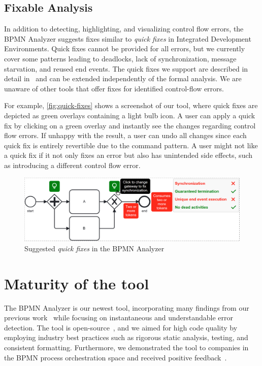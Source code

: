 \documentclass[
twocolumn
]{ceurart}
\begin{document}
\subsection{Fixable Analysis}
In addition to detecting, highlighting, and visualizing control flow errors, the BPMN Analyzer suggests fixes similar to \textit{quick fixes} in Integrated Development Environments.
Quick fixes cannot be provided for all errors, but we currently cover some patterns leading to deadlocks, lack of synchronization, message starvation, and reused end events.
The quick fixes we support are described in detail in~\cite{krauterInstantaneousComprehensibleFixable2024} and can be extended independently of the formal analysis.
We are unaware of other tools that offer fixes for identified control-flow errors.

For example, \autoref{fig:quick-fixes} shows a screenshot of our tool, where quick fixes are depicted as green overlays containing a light bulb icon.
A user can apply a quick fix by clicking on a green overlay and instantly see the changes regarding control flow errors.
If unhappy with the result, a user can undo all changes since each quick fix is entirely revertible due to the command pattern.
A user might not like a quick fix if it not only fixes an error but also has unintended side effects, such as introducing a different control flow error.

\begin{figure}[ht]
	\centering
	\includegraphics[width=0.8\linewidth]{images/quick-fix}
	\caption{Suggested \textit{quick fixes} in the BPMN Analyzer}
	\label{fig:quick-fixes}
\end{figure}

\section{Maturity of the tool} \label{sec:maturity}
The BPMN Analyzer is our newest tool, incorporating many findings from our previous work~\cite{krauterFormalizationAnalysisBPMN2023} while focusing on instantaneous and understandable error detection.
The tool is open-source~\cite{krauterInstantaneousComprehensibleFixable2024}, and we aimed for high code quality by employing industry best practices such as rigorous static analysis, testing, and consistent formatting.
Furthermore, we demonstrated the tool to companies in the BPMN process orchestration space and received positive feedback~\cite{krauterInstantaneousComprehensibleFixable2024}.
\end{document}

